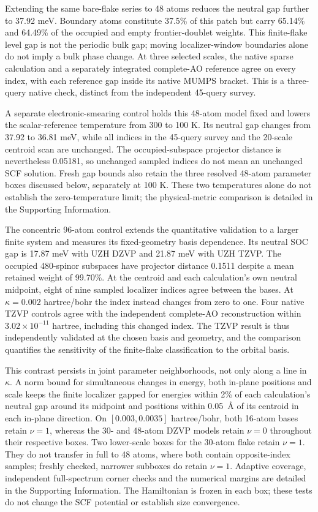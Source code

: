 Extending the same bare-flake series to 48 atoms reduces the
neutral gap further to 37.92 meV. Boundary atoms constitute
37.5\% of this patch but carry 65.14\% and 64.49\% of the
occupied and empty frontier-doublet weights. This finite-flake
level gap is not the periodic bulk gap; moving localizer-window
boundaries alone do not imply a bulk phase change. At three selected
scales, the native sparse calculation and a separately integrated
complete-AO reference agree on every index, with each reference
gap inside its native MUMPS bracket. This is a three-query
native check, distinct from the independent 45-query survey.

A separate electronic-smearing control holds this 48-atom model
fixed and lowers the scalar-reference temperature from 300 to 100 K.
Its neutral gap changes from 37.92 to 36.81 meV, while all indices
in the 45-query survey and the 20-scale centroid scan are unchanged.
The occupied-subspace projector distance is nevertheless 0.05181,
so unchanged sampled indices do not mean an unchanged SCF solution.
Fresh gap bounds also retain the three resolved 48-atom parameter
boxes discussed below, separately at 100 K.
These two temperatures alone do not establish the zero-temperature
limit; the physical-metric comparison is detailed in the
Supporting Information.

The concentric 96-atom control extends the quantitative validation to a
larger finite system and measures its fixed-geometry basis dependence.
Its neutral SOC gap is 17.87 meV with UZH DZVP and
21.87 meV with UZH TZVP. The occupied 480-spinor subspaces have
projector distance 0.1511 despite a mean retained weight of 99.70\%.
At the centroid and each calculation's own neutral midpoint,
eight of nine sampled localizer indices agree between the bases.
At $\kappa=0.002$ hartree/bohr the index instead changes from zero
to one. Four native TZVP controls agree with the independent
complete-AO reconstruction within $3.02\times10^{-11}$ hartree,
including this changed index. The TZVP result is thus independently
validated at the chosen basis and geometry, and the comparison quantifies
the sensitivity of the finite-flake classification to the orbital basis.

This contrast persists in joint parameter neighborhoods, not only
along a line in $\kappa$. A norm bound for simultaneous changes in
energy, both in-plane positions and scale keeps the finite localizer
gapped for energies within 2\% of each calculation's neutral gap
around its midpoint and positions within 0.05~\AA{} of its centroid
in each in-plane direction. On $[0.003,0.0035]$ hartree/bohr,
both 16-atom bases retain $\nu=1$, whereas the 30- and 48-atom
DZVP models retain $\nu=0$ throughout their respective boxes.
Two lower-scale boxes for the 30-atom flake retain $\nu=1$.
They do not transfer in full to 48 atoms, where both contain
opposite-index samples; freshly checked, narrower subboxes do
retain $\nu=1$.
Adaptive coverage, independent full-spectrum corner checks and
the numerical margins are detailed in the Supporting Information.
The Hamiltonian is frozen in each box; these tests do not change
the SCF potential or establish size convergence.

